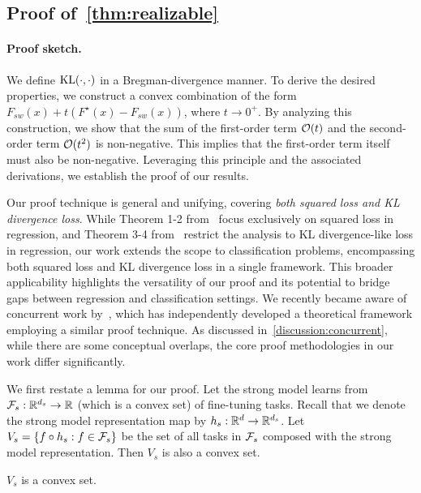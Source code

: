 \subsection{Proof of~\cref{thm:realizable}} \label{theorem1_kl_loss}

\paragraph{Proof sketch.}
We define $\mathrm{KL}(\cdot, \cdot)$ in a Bregman-divergence manner.
To derive the desired properties, we construct a convex combination of the form $F_{sw}(x)+t(F^\star(x)-F_{sw}(x))$, where $t \to 0^+$.
By analyzing this construction, we show that the sum of the first-order term $\mathcal{O}(t)$ and the second-order term $\mathcal{O}(t^2)$ is non-negative.
This implies that the first-order term itself must also be non-negative.
Leveraging this principle and the associated derivations, we establish the proof of our results.


Our proof technique is general and unifying, covering \textit{both squared loss and KL divergence loss}. 
While Theorem 1-2 from~\citet{charikar2024quantifying} focus exclusively on squared loss in regression, and Theorem 3-4 from~\citet{yao2025understanding} restrict the analysis to KL divergence-like loss in regression, 
our work extends the scope to classification problems, encompassing both squared loss and KL divergence loss in a single framework. 
This broader applicability highlights the versatility of our proof and its potential to bridge gaps between regression and classification settings.
We recently became aware of concurrent work by~\citet{mulgund2025relating}, which has independently developed a theoretical framework employing a similar proof technique. As discussed in~\cref{discussion:concurrent}, while there are some conceptual overlaps, the core proof methodologies in our work differ significantly.



We first restate a lemma for our proof.
Let the strong model learns from $\mathcal{F}_s:\mathbb{R}^{d_s} \to \mathbb{R}$ (which is a convex set) of fine-tuning tasks. 
Recall that we denote the strong model representation map by $h_s:\mathbb{R}^d \to \mathbb{R}^{d_s}$. Let $V_s = \{f \circ h_s: f \in \mathcal{F}_s\}$ be the set of all tasks in $\mathcal{F}_s$ composed with the strong model representation. 
Then $V_s$ is also a convex set.
\begin{lemma}
    \label{claim:Vs-convex}
    $V_s$ is a convex set.
\end{lemma}

